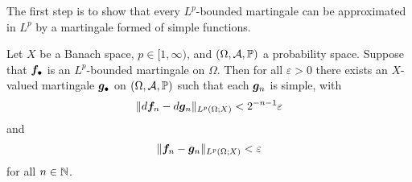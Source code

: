 The first step is to show that every $L^p$-bounded martingale can be approximated in $L^p$ by a martingale formed of simple functions.

\begin{lem}\label{lem:mgale-simple-approx}
  Let $X$ be a Banach space, $p \in [1,\infty)$, and $(\Omega,\mathcal{A},\mathbb{P})$ a probability space.
  Suppose that $\bm{f}_{\bullet}$ is an $L^p$-bounded martingale on $\Omega$. 
  Then for all $\varepsilon > 0$ there exists an $X$-valued martingale $\bm{g}_{\bullet}$ on $(\Omega,\mathcal{A},\mathbb{P})$ such that each $\bm{g}_{n}$ is simple, with
  \begin{equation*}
    \|d\bm{f}_{n} - d\bm{g}_{n}\|_{L^p(\Omega;X)} < 2^{-n-1}\varepsilon
  \end{equation*}
  and
  \begin{equation*}
    \|\bm{f}_{n} - \bm{g}_{n}\|_{L^p(\Omega;X)} < \varepsilon
  \end{equation*}
  for all $n \in \mathbb{N}$.
\end{lem}

